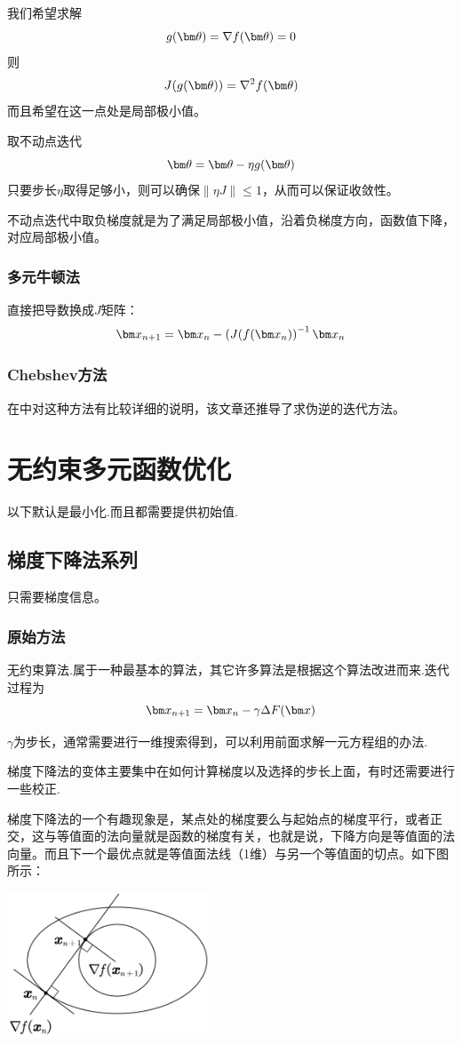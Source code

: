我们希望求解
$$g(\btheta)=\nabla f(\btheta)=0$$
则
$$J(g(\btheta))=\nabla^2 f(\btheta)$$
而且希望在这一点处是局部极小值。

取不动点迭代
$$\btheta=\btheta-\eta g(\btheta)$$
只要步长$\eta$取得足够小，则可以确保$\|\eta J\|\leq 1$，从而可以保证收敛性。

不动点迭代中取负梯度就是为了满足局部极小值，沿着负梯度方向，函数值下降，对应局部极小值。
\subsubsection{多元牛顿法}
直接把导数换成$J$矩阵：
$$\bx_{n+1}=\bx_n-\left(J(f(\bx_n)\right)^{-1}\bx_{n}$$

\subsubsection{Chebshev方法}
在\cite{li_chebyshev-type_2011}中对这种方法有比较详细的说明，该文章还推导了求伪逆的迭代方法。

\section{无约束多元函数优化}
以下默认是最小化.而且都需要提供初始值.

\subsection{梯度下降法系列}\label{gradient-descent-series}
只需要梯度信息。
\subsubsection{原始方法}\label{grade_descent}
无约束算法.属于一种最基本的算法，其它许多算法是根据这个算法改进而来.迭代过程为
$$\bx_{n+1}=\bx_n-\gamma \Delta F(\bx)$$

$\gamma$为步长，通常需要进行一维搜索得到，可以利用前面求解一元方程组的办法.

梯度下降法的变体主要集中在如何计算梯度以及选择的步长上面，有时还需要进行一些校正.

梯度下降法的一个有趣现象是，某点处的梯度要么与起始点的梯度平行，或者正交，这与等值面的法向量就是函数的梯度有关，也就是说，下降方向是等值面的法向量。而且下一个最优点就是等值面法线（1维）与另一个等值面的切点。如下图所示：

\begin{center}
\includegraphics[width=6cm]{figure/grad_descent.png}
\end{center}

